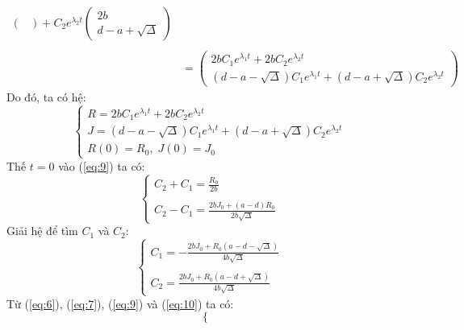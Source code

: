 \documentclass[a4paper]{article}
\begin{document}
\begin{enumerate}
\begin{equation}
\begin{split}
\begin{pmatrix}
            \end{pmatrix} + C_2e^{\lambda_2 t}\begin{pmatrix}
                2b \\
             d - a +\sqrt{\Delta}
            \end{pmatrix}\\ \\
            &= \begin{pmatrix}
                2bC_1e^{\lambda_1 t} + 2bC_2e^{\lambda_2 t} \\
                (d - a -\sqrt{\Delta})C_1e^{\lambda_1 t} + (d - a +\sqrt{\Delta})C_2e^{\lambda_2 t} \nonumber
            \end{pmatrix}
        \end{split}
    \end{equation}
    Do đó, ta có hệ:
    \begin{equation}
        \begin{cases}
            R = 2bC_1e^{\lambda_1 t} + 2bC_2e^{\lambda_2 t} \\
            J = (d - a -\sqrt{\Delta})C_1e^{\lambda_1 t} + (d - a +\sqrt{\Delta})C_2e^{\lambda_2 t}\\
            R(0) = R_0,\; J(0) = J_0
        \end{cases}
    \end{equation}
    Thế $t=0$ vào (\ref{eq:9}) ta có:
    \begin{equation}
        \begin{cases}
            C_2 + C_1 = \frac{R_0}{2b}\\ \\
            C_2 - C_1 = \frac{2bJ_0+(a-d)R_0}{2b\sqrt{\Delta}}
            \nonumber
        \end{cases}
    \end{equation}
    Giải hệ để tìm $C_1$ và $C_2$:
    \begin{equation} \label{eq:10} 
        \begin{cases}
            C_1 = -\frac{2bJ_0 + R_0(a-d-\sqrt{\Delta})}{4b\sqrt{\Delta}}\\ \\
            C_2 = \frac{2bJ_0 + R_0(a-d+\sqrt{\Delta})}{4b\sqrt{\Delta}} 
        \end{cases}
    \end{equation}
    Từ (\ref{eq:6}), (\ref{eq:7}), (\ref{eq:9}) và (\ref{eq:10}) ta có:
    \begin{equation} \label{eq:11}
        \begin{cases}

\end{cases}
\end{equation}
\end{enumerate}
\end{document}
